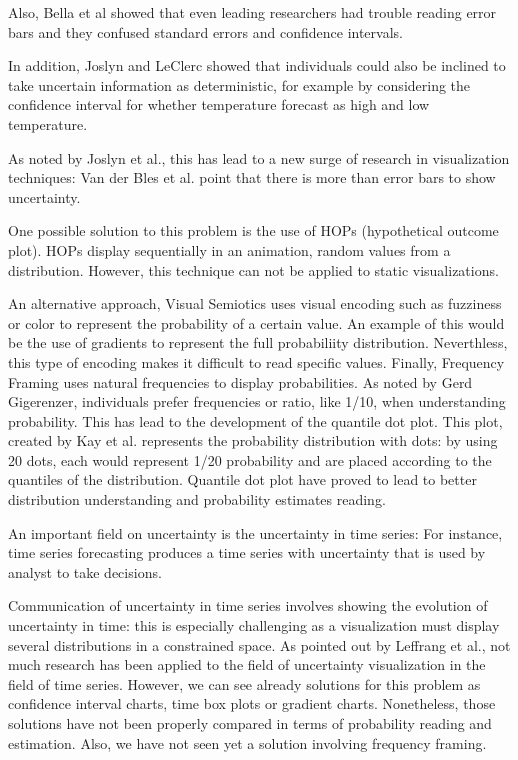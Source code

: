 \documentclass[a4paper,3p,sort&compress]{elsarticle}
\begin{document}
Also, Bella et al showed that even leading researchers had trouble reading error bars and they confused 
standard errors and confidence intervals. 

In addition, Joslyn and LeClerc showed that individuals could also be inclined to take uncertain 
information as deterministic, for example by considering the confidence interval for whether temperature 
forecast as high and low temperature. 

As noted by Joslyn et al., this has lead to a new surge of research in visualization techniques: Van 
der Bles et al. point that there is more than error bars to show uncertainty. 

One possible solution to this problem is the use of HOPs (hypothetical outcome plot). HOPs display 
sequentially in an animation, random values from a distribution. However, this technique can not be 
applied to static visualizations. 

An alternative approach, Visual Semiotics uses visual encoding such as fuzziness or color to represent 
the probability of a certain value. An example of this would be the use of gradients to represent the 
full probabiliity distribution. Neverthless, this type of encoding makes it difficult to read specific 
values. Finally, Frequency Framing uses natural frequencies to display probabilities. As noted by Gerd 
Gigerenzer, individuals prefer frequencies or ratio, like 1/10, when understanding probability. This has 
lead to the development of the quantile dot plot. This plot, created by Kay et al. represents 
the probability distribution with dots: by using 20 dots, each would represent 1/20 probability 
and are placed according 
to the quantiles of the distribution. Quantile dot plot have proved to lead to better distribution 
understanding and probability estimates reading.

An important field on uncertainty is the uncertainty in time series: For instance, time series forecasting 
produces a time series with uncertainty that is used by analyst to take decisions.

Communication of uncertainty in time series involves showing the evolution of uncertainty in time: this 
is especially challenging as a visualization must display several distributions in a constrained space.  
As pointed out by Leffrang et al., not much research has been applied to the field of uncertainty visualization 
in the field of time series. However, we can see already solutions for this problem as confidence interval charts,
 time box plots or gradient charts. Nonetheless, those solutions have not been properly compared in terms of 
 probability reading and estimation. Also, we have not seen yet a solution involving frequency framing.
\end{document}
